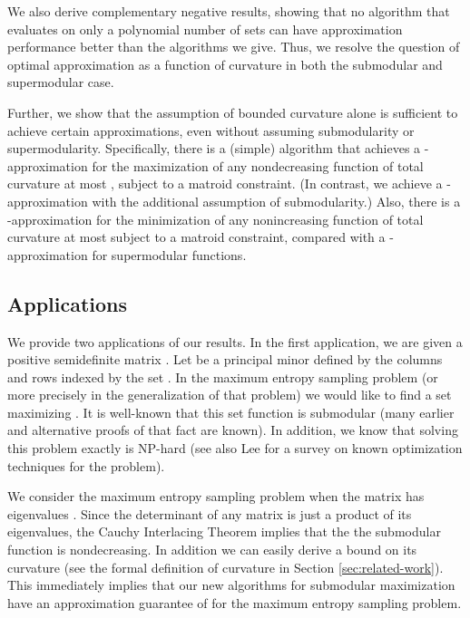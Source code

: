 \documentclass{article}
\theoremstyle{definition}
\begin{document}
We also derive complementary negative results, showing that no algorithm that evaluates  on only a polynomial number of sets can have approximation performance better than the algorithms we give.  Thus, we resolve the question of optimal approximation as a function of curvature in both the submodular and supermodular case.





Further, we show that the assumption of bounded curvature alone is sufficient to achieve certain approximations, even without assuming submodularity or supermodularity. Specifically, there is a (simple) algorithm that achieves a -approximation for the maximization of any nondecreasing function of total curvature at most , subject to a matroid constraint. (In contrast, we achieve a -approximation with the additional assumption of submodularity.) Also, there is a -approximation for the minimization of any  nonincreasing function of total curvature at most  subject to a matroid constraint, compared with a -approximation for supermodular functions.


\subsection{Applications}
We provide two applications of our results.  In the first application, we are given a positive semidefinite matrix . Let  be a principal minor defined by the columns and rows indexed by the set . In the maximum entropy sampling problem (or more precisely in the generalization of that problem) we would like to find a set  maximizing . It is well-known that this set function  is submodular \cite{Kelmans1983} (many earlier and alternative proofs of that fact are known). In addition, we know that solving this problem exactly is NP-hard \cite{Lee1996} (see also Lee \cite{Lee2002} for a survey on known optimization techniques for the problem).

We consider the maximum entropy sampling problem when the matrix  has eigenvalues . Since the determinant of any matrix is just a product of its eigenvalues, the Cauchy Interlacing Theorem implies that the  the submodular function  is nondecreasing. In addition we can easily derive a bound on its curvature  (see the formal definition of curvature in Section \ref{sec:related-work}).  This immediately implies that our new algorithms for submodular maximization have an approximation guarantee of  for the maximum entropy sampling problem.
\end{document}
